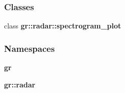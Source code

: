 \subsubsection*{Classes}
\begin{DoxyCompactItemize}
\item 
class {\bf gr\+::radar\+::spectrogram\+\_\+plot}
\end{DoxyCompactItemize}
\subsubsection*{Namespaces}
\begin{DoxyCompactItemize}
\item 
 {\bf gr}
\item 
 {\bf gr\+::radar}
\end{DoxyCompactItemize}
